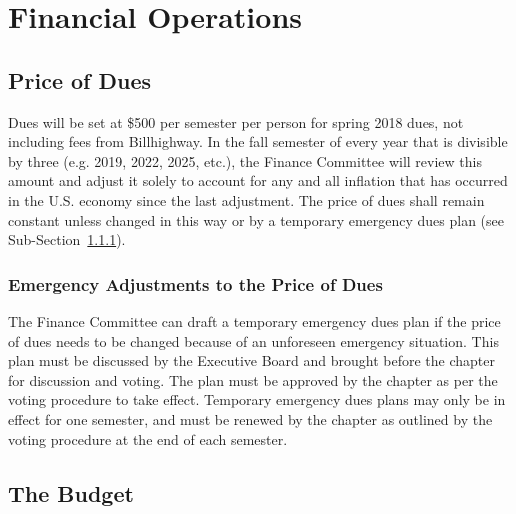 \chapter{Financial Operations}
\label{cha:financial-operations-bylaws}

\section{Price of Dues}

Dues will be set at \$500 per semester per person for spring 2018 dues, not
including fees from Billhighway.
In the fall semester of every year that is divisible by three (e.g. 2019, 2022,
2025, etc.), the Finance Committee will review this amount and adjust it solely
to account for any and all inflation that has occurred in the U.S. economy
since the last adjustment.
The price of dues shall remain constant unless changed in this way or by a
temporary emergency dues plan (see Sub-Section~\ref{sec:emergency-adjustments}).

\subsection{Emergency Adjustments to the Price of Dues}
\label{sec:emergency-adjustments}

The Finance Committee can draft a temporary emergency dues plan if the price of
dues needs to be changed because of an unforeseen emergency situation.
This plan must be discussed by the Executive Board and brought before the
chapter for discussion and voting.
The plan must be approved by the chapter as per the voting procedure to take
effect.
Temporary emergency dues plans may only be in effect for one semester, and must
be renewed by the chapter as outlined by the voting procedure at the end of
each semester.

\section{The Budget}
\label{sec:the-budget}

